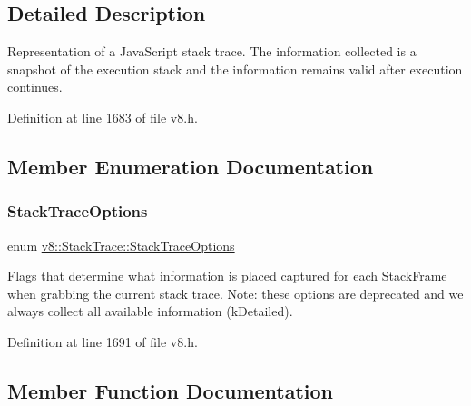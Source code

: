 \subsection{Detailed Description}
Representation of a Java\+Script stack trace. The information collected is a snapshot of the execution stack and the information remains valid after execution continues. 

Definition at line 1683 of file v8.\+h.



\subsection{Member Enumeration Documentation}
\mbox{\label{classv8_1_1StackTrace_a9704e4a37949eb8eb8ccddbddf161492}} 
\subsubsection{\texorpdfstring{Stack\+Trace\+Options}{StackTraceOptions}}
{\footnotesize\ttfamily enum \mbox{\hyperlink{classv8_1_1StackTrace_a9704e4a37949eb8eb8ccddbddf161492}{v8\+::\+Stack\+Trace\+::\+Stack\+Trace\+Options}}}

Flags that determine what information is placed captured for each \mbox{\hyperlink{classv8_1_1StackFrame}{Stack\+Frame}} when grabbing the current stack trace. Note\+: these options are deprecated and we always collect all available information (k\+Detailed). 

Definition at line 1691 of file v8.\+h.



\subsection{Member Function Documentation}
\mbox{\label{classv8_1_1StackTrace_a9ae3595dfa217d50a60cea7ea2e87366}} 
